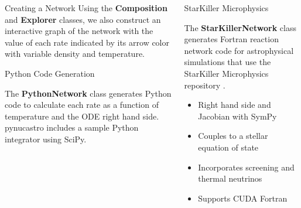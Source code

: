 \documentclass[final]{beamer}
\newlength{\onecolwid}
\newlength{\twocolwid}
\newcommand{\isotm}[2]{{}^{#2}\mathrm{#1}}
\begin{document}
\begin{frame}[t]
\begin{columns}[t]
\begin{column}{\twocolwid}
\begin{columns}[t,totalwidth=\twocolwid]
\begin{column}{\onecolwid}
\begin{block}{Creating a Network}
Using the \textbf{Composition} and \textbf{Explorer} classes, we also
construct an interactive graph of the network with the value of each
rate indicated by its arrow color with variable density and temperature.

\end{block}

\begin{block}{Python Code Generation}

The \textbf{PythonNetwork} class generates Python code to calculate
each rate as a function of temperature and the ODE right hand
side. pynucastro includes a sample Python integrator using SciPy.


\end{block}


\end{column} %

\begin{column}{\onecolwid}\vspace{-.6in} %


\begin{block}{StarKiller Microphysics}

The \textbf{StarKillerNetwork} class generates Fortran reaction
network code for astrophysical simulations that use the StarKiller
Microphysics repository \cite{Zingale.astronum.2017}.

\begin{itemize}
    \item Right hand side and Jacobian with SymPy \cite{SymPy.2017}
    \item Couples to a stellar equation of state
    \item Incorporates screening and thermal neutrinos
    \item Supports CUDA Fortran
\end{itemize}


\end{block}
\end{column}
\end{columns}
\end{column}
\end{columns}
\end{frame}
\end{document}
